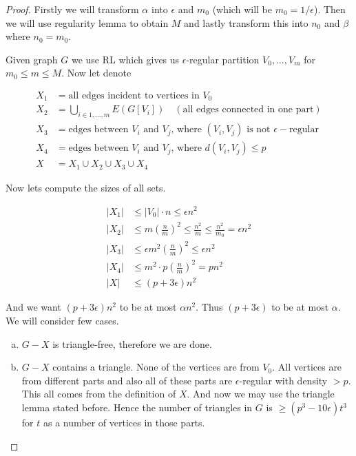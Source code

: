 \begin{proof}
	Firstly we will transform $\alpha$ into $\epsilon$ and $m_0$ (which will be $m_0 = 1/\epsilon$). Then we will use regularity lemma to obtain $M$ and lastly transform this into $n_0$ and $\beta$ where $n_0 = m_0$.
	
	Given graph $G$ we use RL which gives us $\epsilon$-regular partition $V_0, \dots, V_m$ for $m_0 \leq m \leq M$. Now let denote
	
	$$
	\begin{aligned}
		X_1 &= \text{all edges incident to vertices in } V_0 \\
		X_2 &= \bigcup_{i \in 1, \dots, m} E(G[V_{i}]) \quad (\text{all edges connected in one part})\\
		X_3 &= \text{edges between } V_i \text{ and } V_j \text{, where } (V_i, V_j) \text{ is not } \epsilon-\text{regular} \\
		X_4 &= \text{edges between } V_i \text{ and } V_j \text{, where } d(V_i, V_j) \leq p \\
		X &= X_1 \cup X_2 \cup X_3 \cup X_4
	\end{aligned}
	$$
	
	Now lets compute the sizes of all sets.
	
	$$
	\begin{aligned}
		|X_1| &\leq |V_0| \cdot n \leq \epsilon n^2 \\
		|X_2| &\leq m \left( \frac{n}{m} \right)^2 \leq \frac{n^2}{m} \leq \frac{n^2}{m_0} = \epsilon n^2 \\
		|X_3| &\leq \epsilon m^2 \left( \frac{n}{m} \right)^2 \leq \epsilon n^2 \\
		|X_4| &\leq m^2 \cdot p \left( \frac{n}{m} \right)^2 = p n^2\\
		|X| &\leq (p + 3\epsilon) n^2
	\end{aligned}
	$$
	
	And we want $(p + 3\epsilon) n^2$ to be at most $\alpha n^2$. Thus $(p + 3\epsilon)$ to be at most $\alpha$. We will consider few cases.
	
	\begin{enumerate}[(a)]
		\item $G-X$ is triangle-free, therefore we are done.
		\item $G-X$ contains a triangle. None of the vertices are from $V_0$. All vertices are from different parts and also all of these parts are $\epsilon$-regular with density $> p$. This all comes from the definition of $X$. And now we may use the triangle lemma stated before. Hence the number of triangles in $G$ is $\geq (p^3 - 10\epsilon) t^3$ for $t$ as a number of vertices in those parts.
		

\end{enumerate}
\end{proof}
